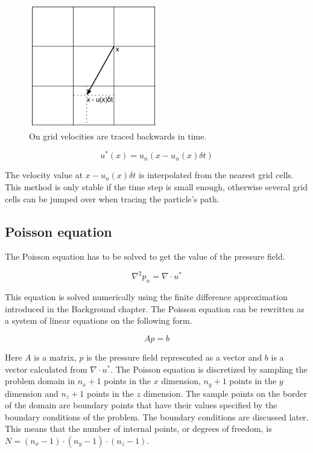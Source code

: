 \begin{figure}[ht]
	\center
	\includegraphics[width=0.5\textwidth]{images/advect_back_trace}
	\caption{On grid velocities are traced backwards in time.}
	\label{fig:7ps}
\end{figure}

$$ u^*(x) = u_n(x - u_n(x) \delta t) $$

The velocity value at $ x - u_n(x) \delta t $ is interpolated from the nearest
grid cells. This method is only stable if the time step is small enough, 
otherwise several grid cells can be jumped over when tracing the particle's
path. 

\subsection{Poisson equation}

The Poisson equation has to be solved to get the value of the pressure field. 

$$ \nabla^2 p_n = \nabla \cdot u^* $$

This equation is solved numerically using the finite difference approximation
introduced in the Background chapter. The Poisson equation can be rewritten as 
a system of linear equations on the following form.

$$ Ap = b $$

Here $A$ is a matrix, $p$ is the pressure field represented as a vector and $b$
is a vector calculated from $\nabla \cdot u^*$. The Poisson equation is discretized 
by sampling the problem domain in $n_x+1$ points in the $x$ dimension, $n_y+1$
points in the $y$ dimension and $n_z+1$ points in the $z$ dimension. The sample
points on the border of the domain are boundary points that have their values
specified by the boundary conditions of the problem. The boundary conditions
are discussed later. This means that the number of internal points, or degrees of
freedom, is $N = (n_x-1) \cdot (n_y-1) \cdot (n_z-1)$.

